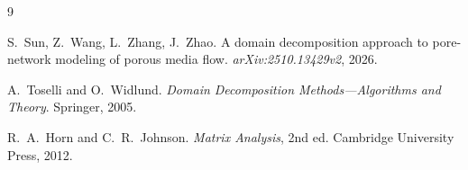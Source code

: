 \documentclass[11pt,a4paper]{article}
\theoremstyle{definition}
\begin{document}
\begin{thebibliography}{9}

S.~Sun, Z.~Wang, L.~Zhang, J.~Zhao.
\newblock A domain decomposition approach to pore-network modeling of porous
  media flow.
\newblock \textit{arXiv:2510.13429v2}, 2026.

A.~Toselli and O.~Widlund.
\newblock \textit{Domain Decomposition Methods---Algorithms and Theory}.
\newblock Springer, 2005.

R.~A.~Horn and C.~R.~Johnson.
\newblock \textit{Matrix Analysis}, 2nd ed.
\newblock Cambridge University Press, 2012.

\end{thebibliography}
\end{document}
